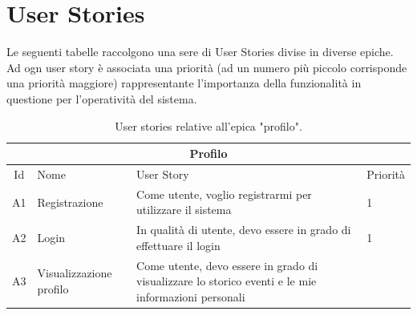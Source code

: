 \documentclass[9pt]{extarticle}
\begin{document}
\customtitle



\tableofcontents
\newpage

\section{User Stories}

Le seguenti tabelle raccolgono una sere di User Stories divise in diverse epiche. Ad ogn user story è associata una priorità (ad un numero più piccolo corrisponde una priorità maggiore) rappresentante l'importanza della funzionalità in questione per l'operatività del sistema.

	
\begin{table}[!htb]
	\centering
	\begin{tabular}{clp{7cm}l} %
		\toprule
		\multicolumn{4}{c}{\textbf{Profilo}}\\ \midrule
		Id & Nome & User Story & Priorità \\ \midrule
		A1  & Registrazione  & Come utente, voglio registrarmi per utilizzare il sistema & 1 \\
		A2  & Login & In qualità di utente, devo essere in grado di effettuare il login & 1 \\
		A3  & Visualizzazione profilo & Come utente, devo essere in grado di visualizzare lo storico eventi e le mie informazioni personali &  \\
		\bottomrule
	\end{tabular}
	\caption{User stories relative all'epica "profilo".}
	\label{tab:profili}
\end{table}
\end{document}
